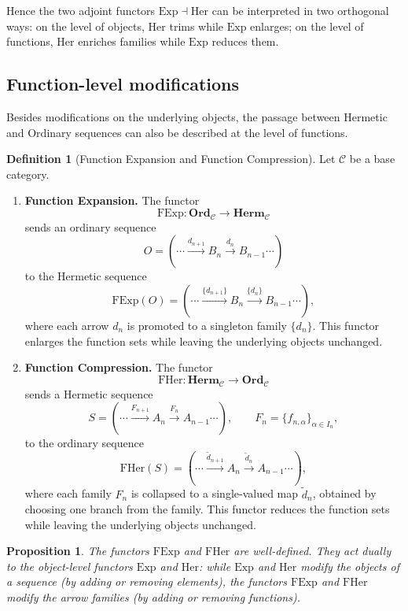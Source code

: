 \documentclass[11pt]{book}
\theoremstyle{definition}
\newtheorem{definition}{Definition}[section]
\theoremstyle{plain}
\newtheorem{proposition}[theorem]{Proposition}
\theoremstyle{remark}
\begin{document}
Hence the two adjoint functors $\mathrm{Exp}\dashv\mathrm{Her}$ 
can be interpreted in two orthogonal ways:
on the level of objects, $\mathrm{Her}$ trims while $\mathrm{Exp}$ enlarges;
on the level of functions, $\mathrm{Her}$ enriches families while $\mathrm{Exp}$ reduces them.

\subsection{Function-level modifications}

Besides modifications on the underlying objects, 
the passage between Hermetic and Ordinary sequences can also be described 
at the level of functions.

\begin{definition}[Function Expansion and Function Compression]
Let $\mathcal C$ be a base category.  

\begin{enumerate}
    \item \textbf{Function Expansion.}  
    The functor
    \[
    \mathrm{FExp}:\mathbf{Ord}_\mathcal C \longrightarrow \mathbf{Herm}_\mathcal C
    \]
    sends an ordinary sequence 
    \[
    O=(\cdots \xrightarrow{d_{n+1}} B_n \xrightarrow{d_n} B_{n-1} \cdots)
    \]
    to the Hermetic sequence 
    \[
    \mathrm{FExp}(O)=(\cdots \xrightarrow{\{d_{n+1}\}} B_n \xrightarrow{\{d_n\}} B_{n-1}\cdots),
    \]
    where each arrow $d_n$ is promoted to a singleton family $\{d_n\}$.  
    This functor enlarges the function sets while leaving the underlying objects unchanged.

    \item \textbf{Function Compression.}  
    The functor
    \[
    \mathrm{FHer}:\mathbf{Herm}_\mathcal C \longrightarrow \mathbf{Ord}_\mathcal C
    \]
    sends a Hermetic sequence 
    \[
    S=(\cdots \xrightarrow{F_{n+1}} A_n \xrightarrow{F_n} A_{n-1} \cdots), \qquad 
    F_n=\{f_{n,\alpha}\}_{\alpha\in I_n},
    \]
    to the ordinary sequence 
    \[
    \mathrm{FHer}(S)=(\cdots \xrightarrow{\tilde d_{n+1}} A_n \xrightarrow{\tilde d_n} A_{n-1}\cdots),
    \]
    where each family $F_n$ is collapsed to a single-valued map $\tilde d_n$, 
    obtained by choosing one branch from the family.  
    This functor reduces the function sets while leaving the underlying objects unchanged.
\end{enumerate}
\end{definition}

\begin{proposition}
The functors $\mathrm{FExp}$ and $\mathrm{FHer}$ are well-defined. 
They act dually to the object-level functors $\mathrm{Exp}$ and $\mathrm{Her}$:  
while $\mathrm{Exp}$ and $\mathrm{Her}$ modify the objects of a sequence 
(by adding or removing elements), 
the functors $\mathrm{FExp}$ and $\mathrm{FHer}$ 
modify the arrow families (by adding or removing functions).
\end{proposition}
\end{document}
